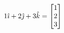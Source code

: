 \documentclass[preview]{standalone}
\begin{document}
\begin{align*}
\special{dvisvgm:raw <g id='unique000'>}1 \hat{\imath} + 2 \hat{\jmath} + 3 \hat{k} = \begin{bmatrix} 1 \\ 2 \\ 3 \end{bmatrix}\special{dvisvgm:raw </g>}
\end{align*}
\end{document}
